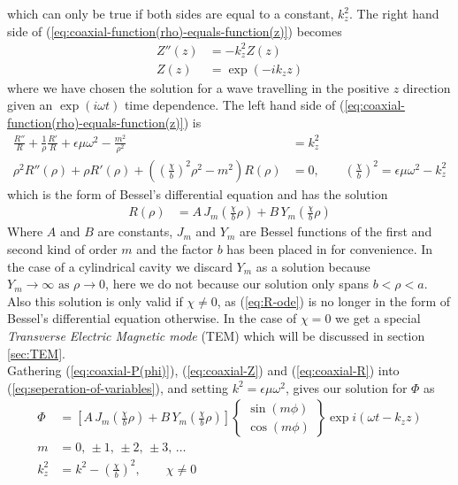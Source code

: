 \documentclass[twoside, a4paper]{article}
\begin{document}
which can only be true if both sides are equal to a constant, $k_z^2$. The right hand side of (\ref{eq:coaxial-function(rho)-equals-function(z)}) becomes
\begin{align}
\label{eq:coaxial-Z}
Z''(z) & = - k_z^2 Z(z)
\nonumber \\
Z(z) & = \exp( - i k_z z )
\end{align}
where we have chosen the solution for a wave travelling in the positive $z$ direction given an $\exp(i \omega t)$ time dependence. The left hand side of (\ref{eq:coaxial-function(rho)-equals-function(z)}) is
\begin{align}
\label{eq:R-ode}
\frac{R''}{R} + \frac{1}{\rho} \frac{R'}{R} +
\epsilon \mu \omega^2 -\frac{m^2}{\rho^2} 
& = k_z^2
\nonumber \\
\rho^2 R''( \rho ) + \rho R'( \rho ) + 
\left( 
\left( \frac{\chi}{b} \right) ^2 \rho^2 - m^2
\right)
R( \rho ) & = 0,
\quad \quad
\left( \frac{\chi}{b} \right)^2 = \epsilon \mu \omega^2 - k_z^2 
\end{align}
which is the form of Bessel's differential equation and has the solution
\begin{align}
\label{eq:coaxial-R}
R \left( \rho \right) & = A \, J_m \left( \frac{ \chi }{b}  \rho \right) + B \, Y_m \left( \frac{\chi}{b} \rho \right)
\end{align}
Where $A$ and $B$ are constants, $J_m$ and $Y_m$ are Bessel functions of the first and second kind of order $m$ and the factor $b$ has been placed in for convenience. In the case of a cylindrical cavity we discard $Y_m$ as a solution because $Y_m \rightarrow \infty \mbox{ as } \rho \rightarrow 0$, here we do not because our solution only spans \mbox{$b < \rho < a$}. Also this solution is only valid if $\chi \neq 0$, as (\ref{eq:R-ode}) is no longer in the form of Bessel's differential equation otherwise. In the case of $\chi = 0$ we get a special \textit{Transverse Electric Magnetic mode} (TEM) which will be discussed in section \ref{sec:TEM}.\\

Gathering (\ref{eq:coaxial-P(phi)}), (\ref{eq:coaxial-Z}) and (\ref{eq:coaxial-R}) into (\ref{eq:seperation-of-variables}), and setting $k^2 = \epsilon \mu \omega^2$, gives our solution for $\Phi$ as
\begin{align}
\label{eq:phi-solution}
\Phi & = 
\left[
A \, J_m \left( \frac{ \chi}{b} \rho \right) + B \, Y_m \left( \frac{ \chi }{b} \rho \right)
\right]
\left\{
\begin{array}{c}
\sin \left( m \phi \right) \\
\cos \left( m \phi \right)
\end{array}
\right\}
\exp i \left( \omega t -k_z z \right)\\
m & = 0, \, \pm 1, \, \pm 2, \, \pm 3, \, \ldots \nonumber \\
\label{eq:k_z}
k_z^2 & = k^2 - \left( \frac{\chi}{b} \right)^2,
\quad \quad
\chi \neq 0
\end{align}
\end{document}
